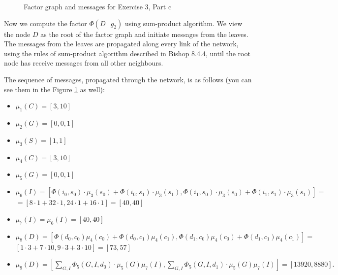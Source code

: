 \documentclass[11pt,a4paper]{article}
\begin{document}
	\begin{figure}[H]
		\caption{Factor graph and messages for Exercise 3, Part c}
		\label{fig:fgraph_3c}
	\end{figure}
	
	Now we compute the factor $\Phi(D \ | \ g_2)$ using sum-product algorithm. We view the node $D$ as the root of the factor graph and initiate messages from the leaves. The messages from the leaves are propagated along every link of the network, using the rules of sum-product algorithm described in Bishop 8.4.4, until the root node has receive messages from all other neighbours.
	
	The sequence of messages, propagated through the network, is as follows (you can see them in the Figure \ref{fig:fgraph_3c} as well):
	\begin{itemize}
		\item $ \mu_1(C) = [3, 10] $
		\item $ \mu_2(G) = [0, 0, 1] $
		\item $ \mu_3(S) = [1, 1] $
		\item $ \mu_4(C) = [3, 10] $
		\item $ \mu_5(G) = [0, 0, 1]$
		\item $ \mu_6(I) = [\Phi(i_0, s_0) \cdot \mu_3(s_0) +  \Phi(i_0, s_1) \cdot \mu_3(s_1), \Phi(i_1, s_0) \cdot \mu_3(s_0) +  \Phi(i_1, s_1) \cdot \mu_3(s_1)] = $\\ $ = [8 \cdot 1 + 32 \cdot 1, 24 \cdot 1 + 16 \cdot 1] = [40, 40]$ 
		\item $ \mu_7(I) = \mu_6(I) = [40, 40]$
		\item $ \mu_8(D) = [\Phi(d_0, c_0) \mu_4(c_0) +  \Phi(d_0, c_1) \mu_4(c_1), \Phi(d_1, c_0) \mu_4(c_0) +  \Phi(d_1, c_1) \mu_4(c_1)] = $ \\
		$ [1 \cdot 3 + 7 \cdot 10, 9 \cdot 3 + 3 \cdot 10] = [73, 57]$
		\item $ \mu_9(D) = \left[\sum_{G, I}\Phi_5(G, I, d_0) \cdot \mu_5(G) \mu_7(I),  \sum_{G, I}\Phi_5(G, I, d_1) \cdot \mu_5(G) \mu_7(I) \right] = [13920, 8880].$
		
	\end{itemize}
	
\end{document}
